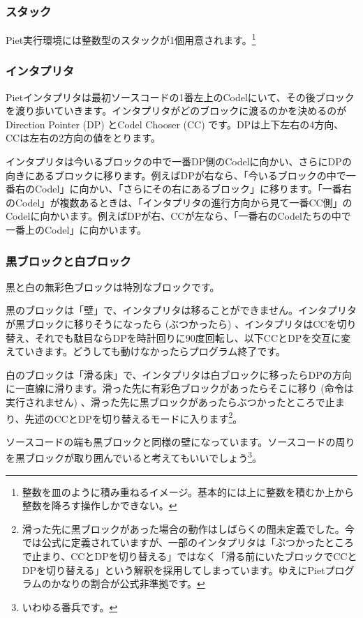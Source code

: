 \subsubsection{スタック}
Piet実行環境には整数型のスタックが1個用意されます。\footnote{整数を皿のように積み重ねるイメージ。基本的には上に整数を積むか上から整数を降ろす操作しかできない。}

\subsubsection{インタプリタ}
Pietインタプリタは最初ソースコードの1番左上のCodelにいて、その後ブロックを渡り歩いていきます。インタプリタがどのブロックに渡るのかを決めるのがDirection Pointer (DP) とCodel Chooser (CC) です。DPは上下左右の4方向、CCは左右の2方向の値をとります。

インタプリタは今いるブロックの中で一番DP側のCodelに向かい、さらにDPの向きにあるブロックに移ります。例えばDPが右なら、「今いるブロックの中で一番右のCodel」に向かい、「さらにその右にあるブロック」に移ります。「一番右のCodel」が複数あるときは、「インタプリタの進行方向から見て一番CC側」のCodelに向かいます。例えばDPが右、CCが左なら、「一番右のCodelたちの中で一番上のCodel」に向かいます。

\subsubsection{黒ブロックと白ブロック}
黒と白の無彩色ブロックは特別なブロックです。

黒のブロックは「壁」で、インタプリタは移ることができません。インタプリタが黒ブロックに移りそうになったら (ぶつかったら) 、インタプリタはCCを切り替え、それでも駄目ならDPを時計回りに90度回転し、以下CCとDPを交互に変えていきます。どうしても動けなかったらプログラム終了です。

白のブロックは「滑る床」で、インタプリタは白ブロックに移ったらDPの方向に一直線に滑ります。滑った先に有彩色ブロックがあったらそこに移り (命令は実行されません) 、滑った先に黒ブロックがあったらぶつかったところで止まり、先述のCCとDPを切り替えるモードに入ります\footnote{滑った先に黒ブロックがあった場合の動作はしばらくの間未定義でした。今では公式に定義されていますが、一部のインタプリタは「ぶつかったところで止まり、CCとDPを切り替える」ではなく「滑る前にいたブロックでCCとDPを切り替える」という解釈を採用してしまっています。ゆえにPietプログラムのかなりの割合が公式非準拠です。}。

ソースコードの端も黒ブロックと同様の壁になっています。ソースコードの周りを黒ブロックが取り囲んでいると考えてもいいでしょう\footnote{いわゆる番兵です。}。

